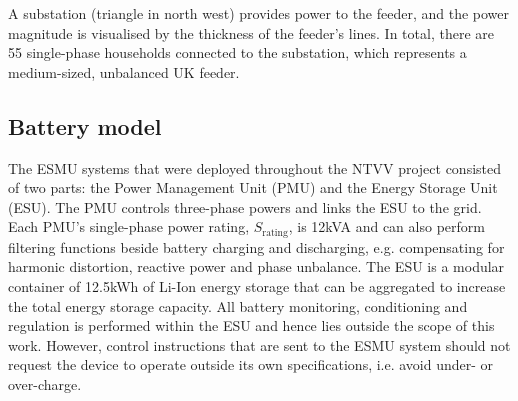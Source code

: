 

A substation (triangle in north west) provides power to the feeder, and the power magnitude is visualised by the thickness of the feeder's lines.
In total, there are 55 single-phase households connected to the substation, which represents a medium-sized, unbalanced UK feeder.

\subsection{Battery model}
\label{ch1:subsec:battery-model}


The ESMU systems that were deployed throughout the NTVV project consisted of two parts: the Power Management Unit (PMU) and the Energy Storage Unit (ESU).
The PMU controls three-phase powers and links the ESU to the grid.
Each PMU's single-phase power rating, $S_\text{rating}$, is 12kVA and can also perform filtering functions beside battery charging and discharging, e.g. compensating for harmonic distortion, reactive power and phase unbalance.
The ESU is a modular container of 12.5kWh of Li-Ion energy storage that can be aggregated to increase the total energy storage capacity.
All battery monitoring, conditioning and regulation is performed within the ESU and hence lies outside the scope of this work.
However, control instructions that are sent to the ESMU system should not request the device to operate outside its own specifications, i.e. avoid under- or over-charge.

\nomenclature[I]{$\eta$}{Round-trip efficiency of power electronics, where $\eta \in (0, 1]$ (Chapter \ref{ch1})}

